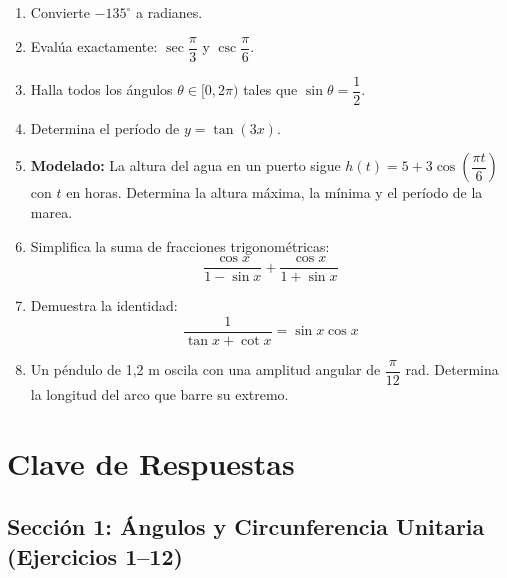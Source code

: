 \documentclass[12pt, letterpaper]{article}
\begin{document}
\begin{enumerate}[resume=ejercicios, leftmargin=*]
  \item \facil{} Convierte $-135^\circ$ a radianes.

  \item \medio{} Evalúa exactamente: $\sec \dfrac{\pi}{3}$ \quad y \quad $\csc \dfrac{\pi}{6}$.

  \item \medio{} Halla todos los ángulos $\theta \in [0, 2\pi)$ tales que $\sin \theta = \dfrac{1}{2}$.

  \item \medio{} Determina el período de $y = \tan(3x)$.

  \item \dificil{} \textbf{Modelado:} La altura del agua en un puerto sigue $h(t) = 5 + 3\cos\left(\dfrac{\pi t}{6}\right)$ con $t$ en horas. Determina la altura máxima, la mínima y el período de la marea.

  \item \dificil{} Simplifica la suma de fracciones trigonométricas:
        $$\frac{\cos x}{1 - \sin x} + \frac{\cos x}{1 + \sin x}$$

  \item \muyDificil{} Demuestra la identidad:
        $$\frac{1}{\tan x + \cot x} = \sin x \cos x$$

  \item \muyDificil{} Un péndulo de 1{,}2 m oscila con una amplitud angular de $\dfrac{\pi}{12}$ rad. Determina la longitud del arco que barre su extremo.
\end{enumerate}
\newpage
\ifmwclaves
  \section{Clave de Respuestas}

  \subsection*{Sección 1: Ángulos y Circunferencia Unitaria (Ejercicios 1--12)}
\end{document}
